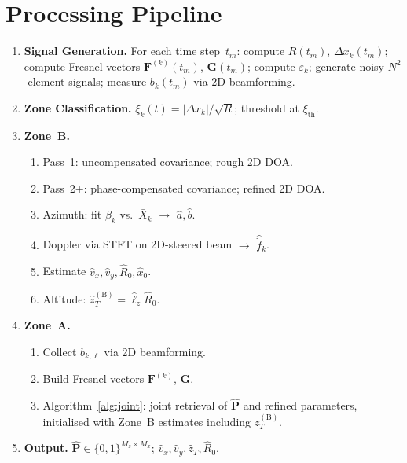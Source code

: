 \documentclass[11pt,a4paper]{article}
\begin{document}
\section{Processing Pipeline}
\label{sec:pipeline}

\begin{enumerate}
  \item \textbf{Signal Generation.}
    For each time step~$t_m$: compute $R(t_m)$,
    $\Delta x_k(t_m)$; compute Fresnel vectors
    $\mathbf{F}^{(k)}(t_m)$, $\mathbf{G}(t_m)$; compute
    $\varepsilon_k$; generate noisy $N^2$-element signals; measure
    $b_k(t_m)$ via 2D beamforming.

  \item \textbf{Zone Classification.}
    $\xi_k(t)=|\Delta x_k|/\sqrt{R}$; threshold at
    $\xi_{\mathrm{th}}$.

  \item \textbf{Zone~B.}
    \begin{enumerate}
      \item Pass~1: uncompensated covariance; rough 2D DOA.
      \item Pass~2+: phase-compensated covariance; refined 2D DOA.
      \item Azimuth: fit $\beta_k$ vs.\ $\bar{X}_k$
        $\to$ $\hat{a},\hat{b}$.
      \item Doppler via STFT on 2D-steered beam $\to$
        $\hat{\dot{f}}_k$.
      \item Estimate $\hat{v}_x,\hat{v}_y,\hat{R}_0,\hat{x}_0$.
      \item Altitude: $\hat{z}_T^{(\mathrm{B})}
        =\hat{\ell}_z\hat{R}_0$.
    \end{enumerate}

  \item \textbf{Zone~A.}
    \begin{enumerate}
      \item Collect $b_{k,\ell}$ via 2D beamforming.
      \item Build Fresnel vectors $\mathbf{F}^{(k)}$, $\mathbf{G}$.
      \item Algorithm~\ref{alg:joint}: joint retrieval of
        $\hat{\mathbf{P}}$ and refined parameters, initialised with
        Zone~B estimates including
        $\hat{z}_T^{(\mathrm{B})}$.
    \end{enumerate}

  \item \textbf{Output.}
    $\hat{\mathbf{P}}\in\{0,1\}^{M_z\times M_x}$;\;
    $\hat{v}_x,\hat{v}_y,\hat{z}_T,\hat{R}_0$.
\end{enumerate}
\end{document}
